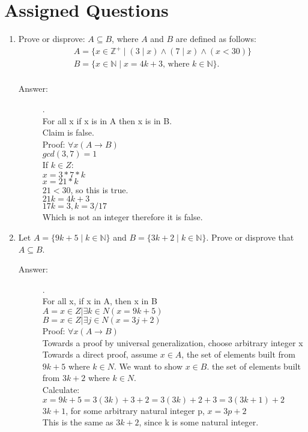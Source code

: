 \documentclass[12pt, oneside]{article}
\begin{document}
\section*{Assigned Questions}
\begin{enumerate}
\item Prove or disprove: $A \subseteq B$, where $A$ and $B$ are defined as follows:
\[
\begin{array}{l}
A = \{x\in\mathbb{Z}^+ \mid (3 \mid x) \land (7 \mid x) \land (x < 30)\} \\
B = \{x\in\mathbb{N} \mid x = 4k + 3\textrm{, where } k \in \mathbb{N}\}. \\
\end{array}
\]

\begin{description}
    \item[Answer:] .\\
    For all x if x is in A then x is in B.\\
    Claim is false.\\
    Proof: $\forall x (A \rightarrow B)$\\
    $gcd(3,7) = 1$\\
    If $k \in Z$:\\
    $x = 3 * 7 *  k$\\
    $	x = 21 * k $\\
    $21 < 30$, so this is true.\\
    $21k = 4k + 3 $\\
    $17k = 3, k = 3/17$\\
    Which is not an integer therefore it is false.
\end{description}

\item Let $A = \{9k + 5 \mid k \in \mathbb{N}\}$ and $B = \{3k + 2 \mid k \in \mathbb{N}\}$. Prove or disprove that $A \subseteq B$.
\begin{description}
    \item[Answer:] .\\
    For all x, if x in A, then x in B\\
    $A = {x \in Z | \exists k \in N (x = 9k+5)}$\\
    $B = {x \in Z | \exists j \in N (x = 3j+2)}$\\
    Proof:  $\forall x(A \rightarrow B)$\\
    Towards a proof by universal generalization, choose arbitrary integer x\\
    Towards a direct proof, assume $x \in A$, the set of elements built from $9k+5$ where $k \in N$. We want to show $x \in B$. the set of elements built from $3k+2$ where $k \in N$.\\
    Calculate: $x = 9k + 5 = 3(3k) + 3 + 2 = 3(3k) + 2 + 3 = 3(3k+1) + 2$\\
    $3k+1$, for some arbitrary natural integer p, $x = 3p + 2$\\
    This is the same as $3k + 2$, since k is some natural integer.
\end{description}


\end{enumerate}
\end{document}
